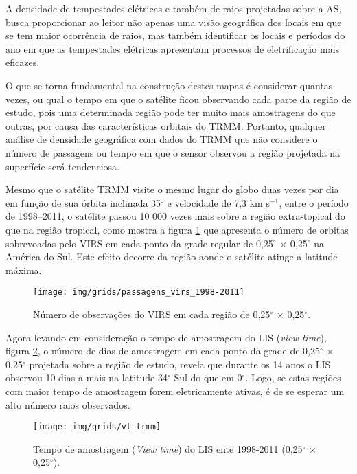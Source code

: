 A densidade de tempestades elétricas e também de raios projetadas sobre a AS, busca proporcionar ao leitor não apenas uma visão geográfica dos locais em que se tem maior ocorrência de raios, mas também identificar os locais e períodos do ano em que as tempestades elétricas apresentam processos de eletrificação mais eficazes.  

O que se torna fundamental na construção destes mapas é considerar quantas vezes, ou qual o tempo em que o satélite ficou observando cada parte da região de estudo, pois uma determinada região pode ter muito mais amostragens do que outras, por causa das características orbitais do TRMM. Portanto, qualquer análise de densidade geográfica com dados do TRMM que não considere o número de passagens ou tempo em que o sensor observou a região projetada na superfície será tendenciosa. 

Mesmo que o satélite TRMM visite o mesmo lugar do globo duas vezes por dia em função de sua órbita inclinada 35$^{\circ}$ e velocidade de 7,3 km s$^{-1}$, entre o período de 1998--2011, o satélite passou {10 000} vezes mais sobre a região extra-topical do que na região tropical, como mostra a figura \ref{VirsVT} que apresenta o número de orbitas sobrevoadas pelo VIRS em cada ponto da grade regular de 0,25$^{\circ}$  $\times$ 0,25$^{\circ}$ na América do Sul. Este efeito decorre da região aonde o satélite atinge a latitude máxima.

\begin{figure}[!hb]
  \centering
  {{\texttt{[image: img/grids/passagens\_virs\_1998-2011]}}}
\caption{Número de observações do VIRS em cada região de 0,25$^{\circ}$  $\times$ 0,25$^{\circ}$.}
\label{VirsVT}
\end{figure} 


Agora levando em consideração o tempo de amostragem do LIS (\textit{view time}), figura \ref{lisVT}, o número de dias de amostragem em cada ponto da grade de 0,25$^{\circ}$  $\times$ 0,25$^{\circ}$ projetada sobre a região de estudo, revela que durante os 14 anos o LIS observou 10 dias a mais na latitude 34$^{\circ}$ Sul do que em 0$^{\circ}$. Logo, se estas regiões com maior tempo de amostragem forem eletricamente ativas, é de se esperar um alto número raios observados.

\begin{figure}[!ht]
  \centering
  {{\texttt{[image: img/grids/vt\_trmm]}} }
  \caption{Tempo de amostragem (\textit{View time}) do LIS ente 1998-2011 (0,25$^{\circ}$  $\times$ 0,25$^{\circ}$).}
\label{lisVT}
\end{figure} 

